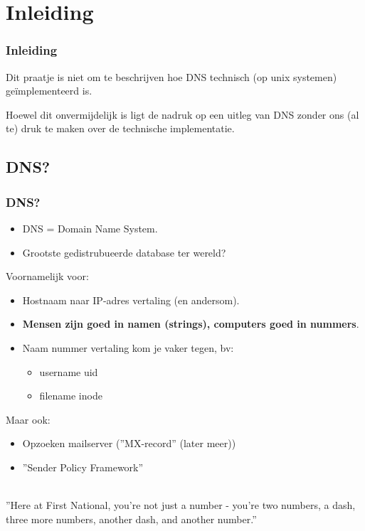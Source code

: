 \section{Inleiding}
\begin{styleframe}
        \frametitle{Inleiding}
Dit praatje is niet om te beschrijven hoe DNS technisch (op unix systemen) ge\"implementeerd is.

Hoewel dit onvermijdelijk is ligt de nadruk op een uitleg van DNS zonder ons (al te) druk te maken over de technische implementatie.
\end{styleframe}

\subsection{DNS?}
\begin{styleframe}
	\frametitle{DNS?}
\begin{itemize}
	\item DNS = Domain Name System.
	\item[] Grootste gedistrubueerde database ter wereld?
	\pause
\end{itemize}
Voornamelijk voor:
\begin{itemize}
	\item Hostnaam naar IP-adres vertaling (en andersom).
	\item[] {\bf Mensen zijn goed in namen (strings), computers goed in nummers}.
	\item[] Naam {\tt <->} nummer vertaling kom je vaker tegen, bv:
	\begin{itemize}
		\item username {\tt <->} uid
		\item filename {\tt <->} inode
	\end{itemize}
\end{itemize}
\pause
Maar ook:
\begin{itemize}
	\item Opzoeken mailserver (''MX-record'' (later meer))
	\item ''Sender Policy Framework''
\end{itemize}
~\\
\tiny{''Here at First National, you're not just a number - you're two numbers,
a dash, three more numbers, another dash, and another number.''}
\end{styleframe}

